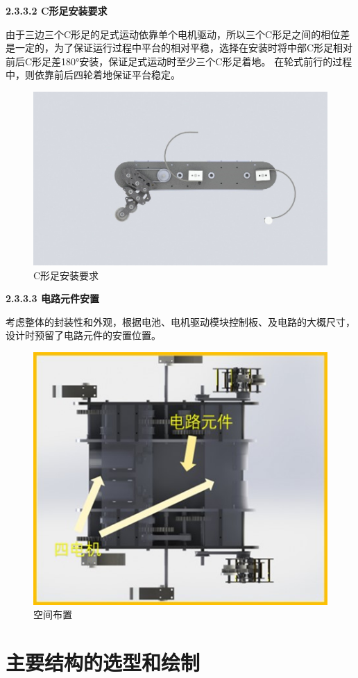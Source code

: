 \documentclass[12pt]{article}
\begin{document}
\begin{CJK}{UTF8}{gbsn}
\textbf{2.3.3.2	C形足安装要求}\par
由于三边三个C形足的足式运动依靠单个电机驱动，所以三个C形足之间的相位差是一定的，为了保证运行过程中平台的相对平稳，选择在安装时将中部C形足相对前后C形足差180°安装，保证足式运动时至少三个C形足着地。
    在轮式前行的过程中，则依靠前后四轮着地保证平台稳定。
 \begin{figure}[H]
\centering
\includegraphics[width=.65\textwidth]{chap2//fig23.jpg}
\caption{C形足安装要求}
\end{figure}

\textbf{2.3.3.3	电路元件安置}\par
考虑整体的封装性和外观，根据电池、电机驱动模块控制板、及电路的大概尺寸，设计时预留了电路元件的安置位置。
 \begin{figure}[H]
\centering
\includegraphics[width=.55\textwidth]{chap2//fig24.jpg}
\caption{空间布置}
\end{figure}


\section{主要结构的选型和绘制}


\end{CJK}
\end{document}
